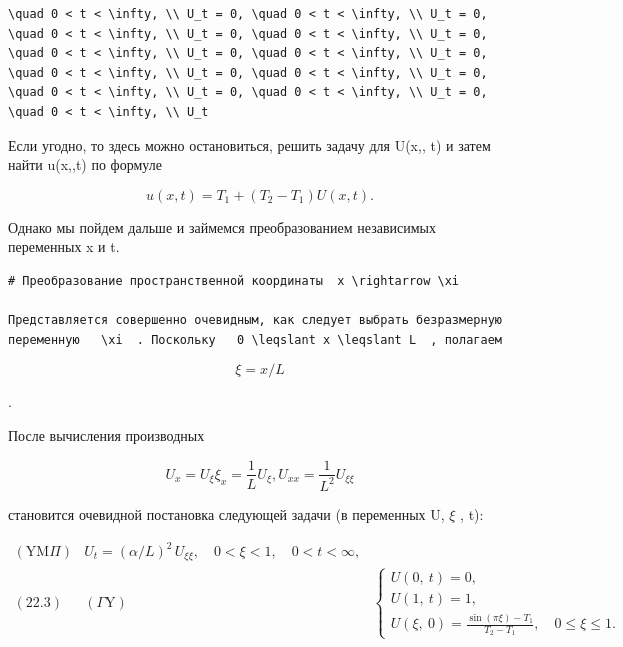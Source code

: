 \documentclass[
  ukrainian,
]{article}
\begin{document}
\begin{verbatim}
\quad 0 < t < \infty, \\ U_t = 0, \quad 0 < t < \infty, \\ U_t = 0, \quad 0 < t < \infty, \\ U_t = 0, \quad 0 < t < \infty, \\ U_t = 0, \quad 0 < t < \infty, \\ U_t = 0, \quad 0 < t < \infty, \\ U_t = 0, \quad 0 < t < \infty, \\ U_t = 0, \quad 0 < t < \infty, \\ U_t = 0, \quad 0 < t < \infty, \\ U_t = 0, \quad 0 < t < \infty, \\ U_t = 0, \quad 0 < t < \infty, \\ U_t
\end{verbatim}

Если угодно, то здесь можно остановиться, решить задачу для U\left(x,,
t\right) и затем найти u\left(x,,t\right) по формуле

\[
u(x, t) = T_1 + (T_2 - T_1) U(x, t).
\]

Однако мы пойдем дальше и займемся преобразованием независимых
переменных x и t.

\begin{verbatim}
# Преобразование пространственной координаты  x \rightarrow \xi

Представляется совершенно очевидным, как следует выбрать безразмерную переменную   \xi  . Поскольку   0 \leqslant x \leqslant L  , полагаем
\end{verbatim}

\[
\xi = x/L
\]

.

После вычисления производных

\[
U_x = U_{\xi} \xi_x = \frac{1}{L} U_{\xi},
U_{xx} = \frac{1}{L^2} U_{\xi\xi}
\]

становится очевидной постановка следующей задачи (в переменных U,
\(\xi\) , t):

\[
\begin{array}{ll} (\text{YM}\Pi) & U_t = (\alpha/L)^2 \, U_{\xi\xi}, \quad 0 < \xi < 1, \quad 0 < t < \infty, \\ (22.3) & (\Gamma \text{Y}) & \begin{cases} U(0,\ t) = 0, \\ U(1,\ t) = 1, \\ U(\xi,\ 0) = \frac{\sin\left(\pi\xi\right) - T_1}{T_2 - T_1}, \quad 0 \leqslant \xi \leqslant 1. \end{cases} \end{array}
\]
\end{document}
